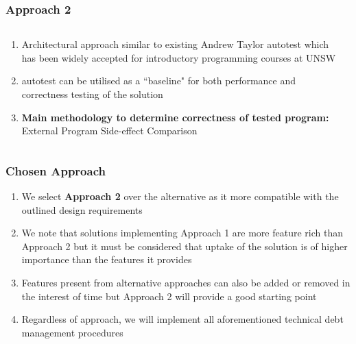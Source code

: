 \documentclass[xcolor]{beamer}
\begin{document}
\begin{frame}[fragile]
	\frametitle{Approach 2}
	\begin{columns}
		\begin{column}{0.6\textwidth}
			\begin{enumerate}
				\setlength\itemsep{0.70em}
				\item Architectural approach similar to existing Andrew Taylor autotest which has been widely accepted for introductory programming courses at UNSW
				\item autotest can be utilised as a ``baseline" for both performance and correctness testing of the solution
				\item \textbf{Main methodology to determine correctness of tested program:} External Program Side-effect Comparison
			\end{enumerate}
		\end{column}
		\begin{column}{0.35\textwidth}
			\centering
		\end{column}
	\end{columns}
\end{frame}
\begin{frame}
	\frametitle{Chosen Approach}
	\begin{enumerate}
		\setlength\itemsep{1em}
		\item We select \textbf{Approach 2} over the alternative as it more compatible with the outlined design requirements 
			\pause
		\item We note that solutions implementing Approach 1 are more feature rich than Approach 2 but it must be considered that uptake of the solution is of higher importance than the features it provides
			\pause
		\item Features present from alternative approaches can also be added or removed in the interest of time but Approach 2 will provide a good starting point
			\pause
		\item Regardless of approach, we will implement all aforementioned technical debt management procedures
	\end{enumerate}
\end{frame}
\end{document}
